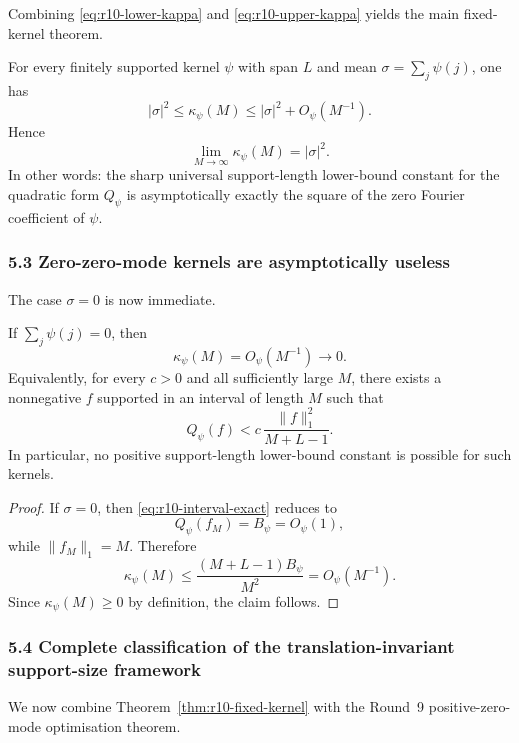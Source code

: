 Combining \eqref{eq:r10-lower-kappa} and \eqref{eq:r10-upper-kappa} yields the main fixed-kernel theorem.

\begin{theorem}
\label{thm:r10-fixed-kernel}
For every finitely supported kernel \(\psi\) with span \(L\) and mean \(\sigma=\sum_j\psi(j)\), one has
\[
|\sigma|^2\le \kappa_\psi(M)\le |\sigma|^2+O_\psi(M^{-1}).
\]
Hence
\begin{equation}
\label{eq:r10-kappa-limit}
\lim_{M\to\infty}\kappa_\psi(M)=|\sigma|^2.
\end{equation}
In other words: the sharp universal support-length lower-bound constant for the quadratic form \(Q_\psi\) is asymptotically exactly the square of the zero Fourier coefficient of \(\psi\).
\end{theorem}

\subsubsection{5.3 Zero-zero-mode kernels are asymptotically useless}

The case \(\sigma=0\) is now immediate.

\begin{corollary}
\label{cor:r10-zero}
If \(\sum_j\psi(j)=0\), then
\[
\kappa_\psi(M)=O_\psi(M^{-1})\to 0.
\]
Equivalently, for every \(c>0\) and all sufficiently large \(M\), there exists a nonnegative \(f\) supported in an interval of length \(M\) such that
\[
Q_\psi(f)< c\,\frac{\|f\|_1^2}{M+L-1}.
\]
In particular, no positive support-length lower-bound constant is possible for such kernels.
\end{corollary}

\begin{proof}
If \(\sigma=0\), then \eqref{eq:r10-interval-exact} reduces to
\[
Q_\psi(f_M)=B_\psi=O_\psi(1),
\]
while \(\|f_M\|_1=M\). Therefore
\[
\kappa_\psi(M)
\le
\frac{(M+L-1)B_\psi}{M^2}
=O_\psi(M^{-1}).
\]
Since \(\kappa_\psi(M)\ge 0\) by definition, the claim follows.
\end{proof}

\subsubsection{5.4 Complete classification of the translation-invariant support-size framework}

We now combine Theorem~\ref{thm:r10-fixed-kernel} with the Round~9 positive-zero-mode optimisation theorem.

